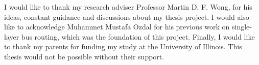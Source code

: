 I would like to thank my research adviser Professor Martin D. F. Wong, for his ideas, constant guidance and discussions about my thesis project. I would also like to acknowledge Muhammet Mustafa Ozdal for his previous work on single-layer bus routing, which was the foundation of this project. Finally, I would like to thank my parents for funding my study at the University of Illinois. This thesis would not be possible without their support.
